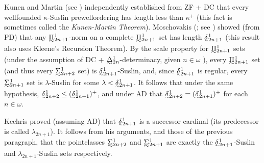 \documentclass{book}%
\def\underTilde#1{{\baselineskip=0pt\vtop{\hbox{$#1$}\hbox{$\sim$}}}{}}
\def\undertilde#1{{\baselineskip=0pt\vtop
  {\hbox{$#1$}\hbox{$\scriptscriptstyle\sim$}}}{}}
\newcommand{\uTPi}{\underTilde{\Pi}}
\newcommand{\uTSigma}{\underTilde{\Sigma}}
\newcommand{\uTDelta}{\underTilde{\Delta}}
\newcommand{\utdelta}{\undertilde{\delta}}
\begin{document}
Kunen and Martin
(see \cite{KechrisMoschovakis:1978})
independently established from ZF + DC that every
wellfounded $\kappa$-Suslin prewellordering has length less than
$\kappa^{+}$ (this fact is sometimes called the \emph{Kunen-Martin
Theorem}). Moschovakis (; see
\cite[4C.14]{Moschovakis:DST09}) showed (from PD) that any
$\uTPi^{1}_{2n+1}$-norm on a complete $\uTPi^{1}_{2n+1}$ set has
length $\undertilde{\delta}^{1}_{2n+1}$ (this result also uses
Kleene's Recursion Theorem).
By the scale property for $\uTPi^{1}_{2n+1}$ sets (under the assumption of
DC + $\uTDelta^{1}_{2n}$-determinacy, given $n \in \omega$ \cite{Moschovakis:1971}),
every $\uTPi^{1}_{2n+1}$ set (and thus every
$\uTSigma^{1}_{2n+2}$ set) is
$\undertilde{\delta}^{1}_{2n+1}$-Suslin, and, since $\utdelta^{1}_{2n+1}$ is regular,
every $\uTSigma^{1}_{2n+1}$ set is $\lambda$-Suslin for some $\lambda <
\undertilde{\delta}^{1}_{2n+1}$.
It follows that under the same hypothesis,
$\undertilde{\delta}^{1}_{2n+2} \leq
(\undertilde{\delta}^{1}_{2n+1})^{+}$, and under AD that
$\undertilde{\delta}^{1}_{2n+2} =
(\undertilde{\delta}^{1}_{2n+1})^{+}$ for each $n \in \omega$.


Kechris  proved (assuming AD) that $\undertilde{\delta}^{1}_{2n+1}$ is a successor
cardinal (its predecessor is called
$\lambda_{2n+1}$).
It follows from his arguments, and those of
the previous paragraph, that the pointclasses
$\uTSigma^{1}_{2n+2}$ and $\uTSigma^{1}_{2n+1}$ are exactly the
$\undertilde{\delta}^{1}_{2n+1}$-Suslin and $\lambda_{2n+1}$-Suslin
sets respectively.
\end{document}
